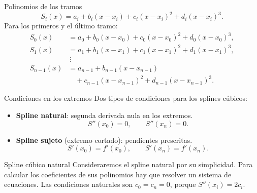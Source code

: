 \documentclass[original_version/main.tex]{subfiles}
\begin{document}
\begin{frame}[t]{Polinomios de los tramos}
\small
\[S_i(x)=a_i+b_i(x-x_i)+c_i(x-x_i)^2+d_i(x-x_i)^3.\]
Para los primeros y el último tramo:
\begin{align*}
S_0(x)&=a_0+b_0(x-x_0)+c_0(x-x_0)^2+d_0(x-x_0)^3,\\
S_1(x)&=a_1+b_1(x-x_1)+c_1(x-x_1)^2+d_1(x-x_1)^3,\\
&\ \vdots\\
S_{n-1}(x)&=a_{n-1}+b_{n-1}(x-x_{n-1})\\
&\quad+c_{n-1}(x-x_{n-1})^2+d_{n-1}(x-x_{n-1})^3.
\end{align*}
\end{frame}
\begin{frame}[t]{Condiciones en los extremos}
Dos tipos de condiciones para los splines cúbicos:
\begin{itemize}
\item \textbf{Spline natural}: segunda derivada nula en los extremos.
\[S''(x_0)=0,\qquad S''(x_n)=0.\]
\item \textbf{Spline sujeto} (extremo cortado): pendientes prescritas.
\[S'(x_0)=f'(x_0),\qquad S'(x_n)=f'(x_n).\]
\end{itemize}
\end{frame}
\begin{frame}[t]{Spline cúbico natural}
Consideraremos el spline natural por su simplicidad.
\bigskip
Para calcular los coeficientes de sus polinomios hay que resolver un sistema de ecuaciones.
\bigskip
Las condiciones naturales son $c_0=c_n=0$, porque $S''(x_i)=2c_i$.
\end{frame}
\end{document}
